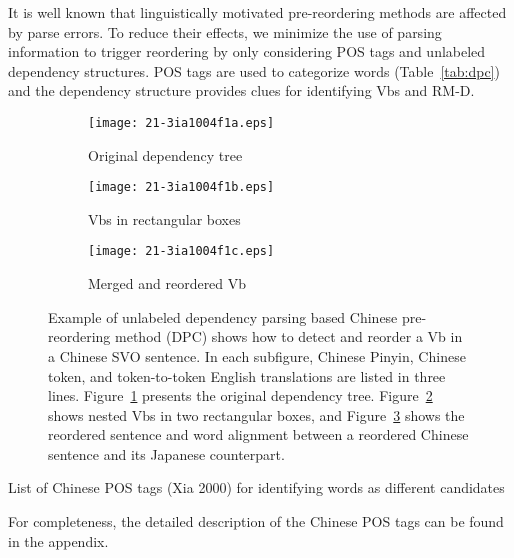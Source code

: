 \documentclass[english]{jnlp_1.4}
\begin{document}
It is well known that linguistically motivated pre-reordering methods are affected by
parse errors. To reduce their effects, we minimize the use of parsing information 
to trigger reordering by only considering POS tags and unlabeled dependency structures. 
POS tags are used to categorize words (Table~\ref{tab:dpc}) and the dependency 
structure provides clues for identifying Vbs and RM-D.

\begin{figure}[p]
\begin{subfigure}{1\textwidth}
\begin{center}
\texttt{[image: 21-3ia1004f1a.eps]}
\end{center}
\caption{Original dependency tree}
\label{fig:vbtreeA}
\end{subfigure}
\vspace{0.5\Cvs}

\begin{subfigure}{1\textwidth}
\begin{center}
\texttt{[image: 21-3ia1004f1b.eps]}
\end{center}
\caption{Vbs in rectangular boxes}
\label{fig:vbtreeB}
\end{subfigure}
\vspace{0.5\Cvs}

\begin{subfigure}{1\textwidth}
\begin{center}
\texttt{[image: 21-3ia1004f1c.eps]}
\end{center}
\caption{Merged and reordered Vb}
\label{fig:vbtreeC}
\end{subfigure}
\caption{Example of unlabeled dependency parsing based Chinese pre-reordering 
method (DPC) shows how to detect and reorder a Vb in a 
Chinese SVO sentence. In each subfigure, Chinese Pinyin, Chinese token, 
and token-to-token English translations are listed in three lines.
Figure~\ref{fig:vbtreeA} presents the original dependency tree.
Figure~\ref{fig:vbtreeB} shows nested Vbs in two rectangular 
boxes, and Figure~\ref{fig:vbtreeC} shows the reordered sentence and word 
alignment between a reordered Chinese sentence and its Japanese counterpart.}
\label{fig:vbtree}
\end{figure}

\begin{table}[t]
\caption{List of Chinese POS tags (Xia 2000) for identifying words as different candidates}
\label{tab:dpc}
\vspace{8pt}

\vspace{4pt}
\small
For completeness, the detailed description of the Chinese POS tags can be found in the appendix.
\par
\end{table}
\end{document}
